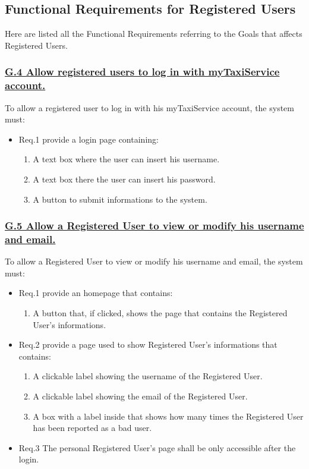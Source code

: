 		\subsection{Functional Requirements for Registered Users}
		Here are listed all the Functional Requirements referring to the Goals that affects Registered Users.

			\subsubsection{\lbrack \hyperref[sec:g4]{G.4 Allow registered users to log in with myTaxiService account.}\rbrack}\label{sec:frs4}
			To allow a registered user to log in with his myTaxiService account, the system must:

				\begin{itemize}
					\item \lbrack Req.1\rbrack \label{sec:fr1_g4} provide a login page containing:
						\begin{enumerate}
							\item A text box where the user can insert his username.
							\item A text box there the user can insert his password.
							\item A button to submit informations to the system.
						\end{enumerate}
				\end{itemize}

			\subsubsection{\lbrack \hyperref[sec:g5]{G.5 Allow a Registered User to view or modify his username and email.}\rbrack}\label{sec:frs5}
			To allow a Registered User to view or modify his username and email, the system must:

				\begin{itemize}
					\item \lbrack Req.1\rbrack \label{sec:fr1_g5} provide an homepage that contains:
						\begin{enumerate}
							\item A button that, if clicked, shows the page that contains the Registered User's informations.
						\end{enumerate}
					\item \lbrack Req.2\rbrack \label{sec:fr2_g5} provide a page used to show Registered User's informations that contains:
						\begin{enumerate}
							\item A clickable label showing the username of the Registered User.
							\item A clickable label showing the email of the Registered User.
							\item A box with a label inside that shows how many times the Registered User has been reported as a bad user.
						\end{enumerate}
					\item \lbrack Req.3\rbrack \label{sec:fr3_g5} The personal Registered User's page shall be only accessible after the login.
				\end{itemize}


